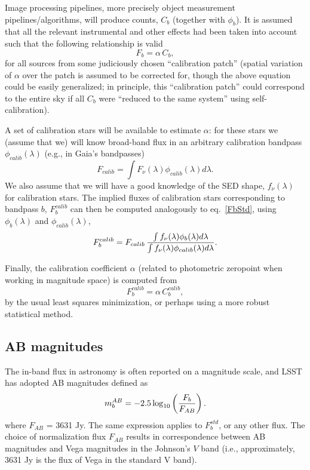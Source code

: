 \documentclass[DM,toc]{lsstdoc}
\begin{document}
Image processing pipelines, more precisely object measurement pipelines/algorithms,
will produce counts, $C_b$ (together with $\phi_b$). It is assumed that all the relevant
instrumental and other effects had been taken into account such that the following
relationship is valid
\begin{equation}
               F_b = \alpha \,  C_b,
\end{equation}
for all sources from some judiciously chosen ``calibration patch'' (spatial variation of $\alpha$ over
the patch is assumed to be corrected for, though the above equation could be easily
generalized; in principle, this  ``calibration patch'' could correspond to the entire
sky if all $C_b$ were ``reduced to the same system'' using self-calibration).

A set of calibration stars will be available to estimate $\alpha$: for these stars
we (assume that we) will know broad-band flux in an arbitrary calibration bandpass
$\phi_{calib}(\lambda)$ (e.g., in Gaia's bandpasses)
\begin{equation}
\label{FbCalib}
             F_{calib} = \int{F_\nu(\lambda) \phi_{calib}(\lambda) d\lambda}.
\end{equation}
We also assume that we will have a good knowledge of the SED shape,
$f_\nu(\lambda)$ for calibration stars. The implied fluxes of calibration stars corresponding
to bandpass $b$, $F_b^{calib}$ can then be computed analogously to eq.~\ref{FbStd}, using
$\phi_b(\lambda)$ and $\phi_{calib}(\lambda)$,
\begin{equation}
\label{FbStdCalib}
F^{calib}_b =  F_{calib} \, {\int{f_\nu(\lambda)  \phi_b(\lambda) d\lambda }  \over   \int{ f_\nu(\lambda) \phi_{calib}(\lambda) d\lambda }}.
\end{equation}


Finally, the calibration coefficient $\alpha$ (related to photometric zeropoint when
working in magnitude space) is computed from
\begin{equation}
\label{alphaCalib}
                 F_b^{calib} = \alpha \,  C_b^{calib},
\end{equation}
by the usual least squares minimization, or perhaps using a more robust statistical method.


\subsection{AB magnitudes}
The in-band flux in astronomy is often reported on a magnitude scale, and LSST has adopted
AB magnitudes defined as
\begin{equation}
\label{ABmag}
              m^{AB}_b = -2.5\log_{10}\left({F_b \over F_{AB}}\right).
\end{equation}
where $F_{AB}$ = 3631 Jy. The same expression applies to $F^{std}_b$, or any other flux.
The choice of normalization flux $F_{AB}$ results in correspondence between AB magnitudes
and Vega magnitudes in the Johnson's $V$ band (i.e., approximately, 3631 Jy is the flux of Vega
in the standard V band).
\end{document}
